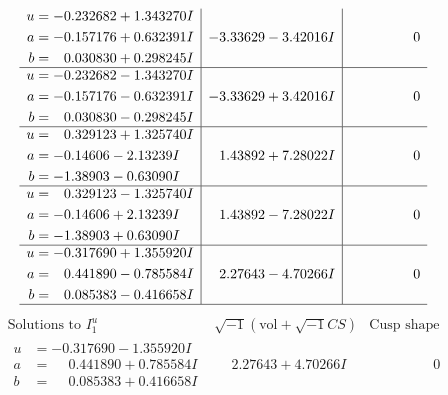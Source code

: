 \documentclass[1p]{elsarticle_modified}
\theoremstyle{definition}
\newcommand{\I}{\sqrt{-1}}
\begin{document}
$$\begin{array}{c|c|c}
\begin{aligned}
u &= -0.232682 + 1.343270 I \\
a &= -0.157176 + 0.632391 I \\
b &= \phantom{-}0.030830 + 0.298245 I\end{aligned}
 & -3.33629 - 3.42016 I & \phantom{-0.000000 } 0 \\ \hline\begin{aligned}
u &= -0.232682 - 1.343270 I \\
a &= -0.157176 - 0.632391 I \\
b &= \phantom{-}0.030830 - 0.298245 I\end{aligned}
 & -3.33629 + 3.42016 I & \phantom{-0.000000 } 0 \\ \hline\begin{aligned}
u &= \phantom{-}0.329123 + 1.325740 I \\
a &= -0.14606 - 2.13239 I \\
b &= -1.38903 - 0.63090 I\end{aligned}
 & \phantom{-}1.43892 + 7.28022 I & \phantom{-0.000000 } 0 \\ \hline\begin{aligned}
u &= \phantom{-}0.329123 - 1.325740 I \\
a &= -0.14606 + 2.13239 I \\
b &= -1.38903 + 0.63090 I\end{aligned}
 & \phantom{-}1.43892 - 7.28022 I & \phantom{-0.000000 } 0 \\ \hline\begin{aligned}
u &= -0.317690 + 1.355920 I \\
a &= \phantom{-}0.441890 - 0.785584 I \\
b &= \phantom{-}0.085383 - 0.416658 I\end{aligned}
 & \phantom{-}2.27643 - 4.70266 I & \phantom{-0.000000 } 0\\
 \hline 
 \end{array}$$\newpage$$\begin{array}{c|c|c}  
\text{Solutions to }I^u_{1}& \I (\text{vol} + \sqrt{-1}CS) & \text{Cusp shape}\\
 \hline 
\begin{aligned}
u &= -0.317690 - 1.355920 I \\
a &= \phantom{-}0.441890 + 0.785584 I \\
b &= \phantom{-}0.085383 + 0.416658 I\end{aligned}
 & \phantom{-}2.27643 + 4.70266 I & \phantom{-0.000000 } 0 \\ \hline\begin{aligned}

\end{aligned}
\end{array}$$
\end{document}
